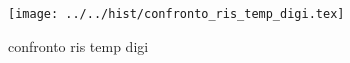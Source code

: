 \begin{figure}[h] \centering\texttt{[image: ../../hist/confronto\_ris\_temp\_digi.tex]}\caption{confronto ris temp digi}\label{hist:confronto_ris_temp_digi} \end{figure}
